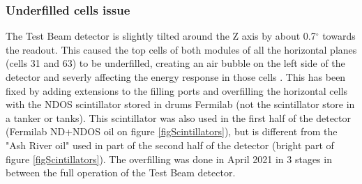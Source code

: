 \documentclass[12pt,a4paper]{article}
\begin{document}
\subsubsection*{Underfilled cells issue}
The Test Beam detector is slightly tilted around the Z axis by about 0.7$^{\circ}$ towards the readout. This caused the top cells of both modules of all the horizontal planes (cells 31 and 63) to be underfilled, creating an air bubble on the left side of the detector and severly affecting the energy response in those cells \cite{TeresaThesis}. This has been fixed \cite{NOVA-doc-49439} by adding extensions to the filling ports and overfilling the horizontal cells with the NDOS scintillator stored in drums Fermilab (not the scintillator store in a tanker or tanks). This scintillator was also used in the first half of the detector (Fermilab ND+NDOS oil on figure \ref{figScintillators}), but is different from the "Ash River oil" used in part of the second half of the detector (bright part of figure \ref{figScintillators}). The overfilling was done in April 2021 in 3 stages in between the full operation of the Test Beam detector.


\end{document}
